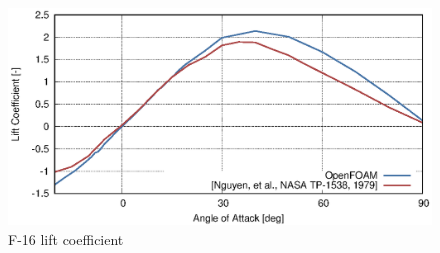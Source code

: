\begin{figure}
  \centering
  \includegraphics[width=140mm]{images/openfoam_f16_cz.eps}
  \caption{F-16 lift coefficient}
  \label{fig-cfd-result-openfoam-cz}
\end{figure}
